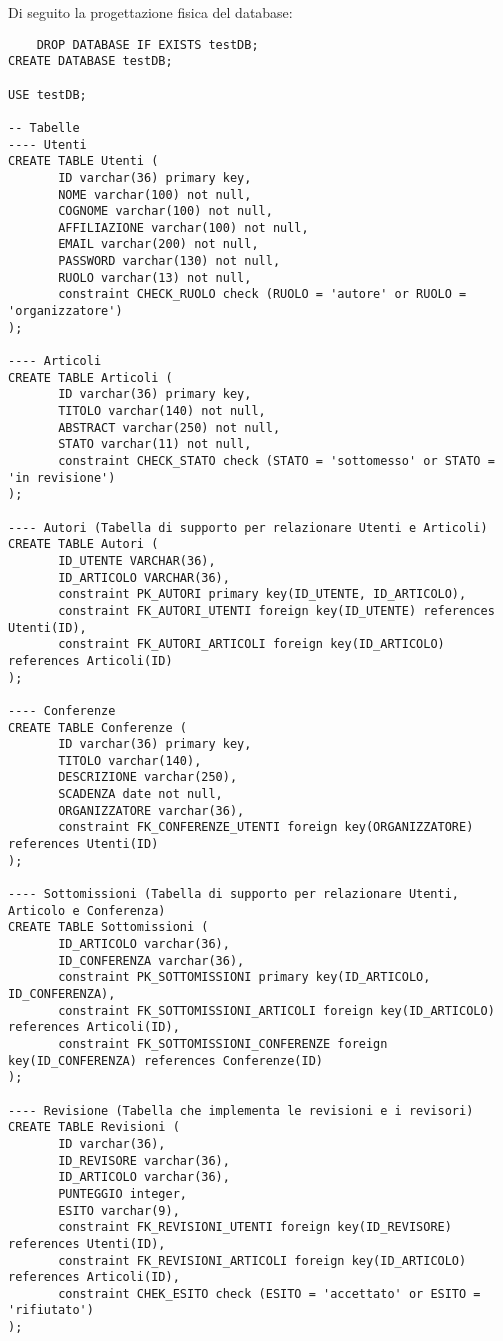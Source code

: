 Di seguito la progettazione fisica del database:
\begin{verbatim}
    DROP DATABASE IF EXISTS testDB;
CREATE DATABASE testDB;

USE testDB;

-- Tabelle
---- Utenti
CREATE TABLE Utenti (
       ID varchar(36) primary key,
       NOME varchar(100) not null,
       COGNOME varchar(100) not null,
       AFFILIAZIONE varchar(100) not null,
       EMAIL varchar(200) not null,
       PASSWORD varchar(130) not null,
       RUOLO varchar(13) not null,
       constraint CHECK_RUOLO check (RUOLO = 'autore' or RUOLO = 'organizzatore')
);

---- Articoli
CREATE TABLE Articoli (
       ID varchar(36) primary key,
       TITOLO varchar(140) not null,
       ABSTRACT varchar(250) not null,
       STATO varchar(11) not null,
       constraint CHECK_STATO check (STATO = 'sottomesso' or STATO = 'in revisione')
);

---- Autori (Tabella di supporto per relazionare Utenti e Articoli)
CREATE TABLE Autori (
       ID_UTENTE VARCHAR(36),
       ID_ARTICOLO VARCHAR(36),
       constraint PK_AUTORI primary key(ID_UTENTE, ID_ARTICOLO),
       constraint FK_AUTORI_UTENTI foreign key(ID_UTENTE) references Utenti(ID),
       constraint FK_AUTORI_ARTICOLI foreign key(ID_ARTICOLO) references Articoli(ID)
);

---- Conferenze
CREATE TABLE Conferenze (
       ID varchar(36) primary key,
       TITOLO varchar(140),
       DESCRIZIONE varchar(250),
       SCADENZA date not null,
       ORGANIZZATORE varchar(36),
       constraint FK_CONFERENZE_UTENTI foreign key(ORGANIZZATORE) references Utenti(ID)
);

---- Sottomissioni (Tabella di supporto per relazionare Utenti, Articolo e Conferenza)
CREATE TABLE Sottomissioni (
       ID_ARTICOLO varchar(36),
       ID_CONFERENZA varchar(36),
       constraint PK_SOTTOMISSIONI primary key(ID_ARTICOLO, ID_CONFERENZA),
       constraint FK_SOTTOMISSIONI_ARTICOLI foreign key(ID_ARTICOLO) references Articoli(ID),
       constraint FK_SOTTOMISSIONI_CONFERENZE foreign key(ID_CONFERENZA) references Conferenze(ID)
);

---- Revisione (Tabella che implementa le revisioni e i revisori)
CREATE TABLE Revisioni (
       ID varchar(36),
       ID_REVISORE varchar(36),
       ID_ARTICOLO varchar(36),
       PUNTEGGIO integer,
       ESITO varchar(9),
       constraint FK_REVISIONI_UTENTI foreign key(ID_REVISORE) references Utenti(ID),
       constraint FK_REVISIONI_ARTICOLI foreign key(ID_ARTICOLO) references Articoli(ID),
       constraint CHEK_ESITO check (ESITO = 'accettato' or ESITO = 'rifiutato')
);
  \end{verbatim}

